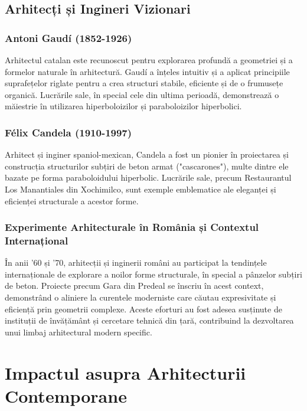 \documentclass[12pt,a4paper]{article}
\begin{document}
\subsection{Arhitecți și Ingineri Vizionari}

\subsubsection{Antoni Gaudí (1852-1926)}
Arhitectul catalan este recunoscut pentru explorarea profundă a geometriei și a formelor naturale în arhitectură. Gaudí a înțeles intuitiv și a aplicat principiile suprafețelor riglate pentru a crea structuri stabile, eficiente și de o frumusețe organică. Lucrările sale, în special cele din ultima perioadă, demonstrează o măiestrie în utilizarea hiperboloizilor și paraboloizilor hiperbolici.

\subsubsection{Félix Candela (1910-1997)}
Arhitect și inginer spaniol-mexican, Candela a fost un pionier în proiectarea și construcția structurilor subțiri de beton armat ("cascarones"), multe dintre ele bazate pe forma paraboloidului hiperbolic. Lucrările sale, precum Restaurantul Los Manantiales din Xochimilco, sunt exemple emblematice ale eleganței și eficienței structurale a acestor forme.

\subsubsection{Experimente Arhitecturale în România și Contextul Internațional}
În anii '60 și '70, arhitecții și inginerii români au participat la tendințele internaționale de explorare a noilor forme structurale, în special a pânzelor subțiri de beton. Proiecte precum Gara din Predeal se înscriu în acest context, demonstrând o aliniere la curentele moderniste care căutau expresivitate și eficiență prin geometrii complexe. Aceste eforturi au fost adesea susținute de instituții de învățământ și cercetare tehnică din țară, contribuind la dezvoltarea unui limbaj arhitectural modern specific.

\section{Impactul asupra Arhitecturii Contemporane}
\end{document}
